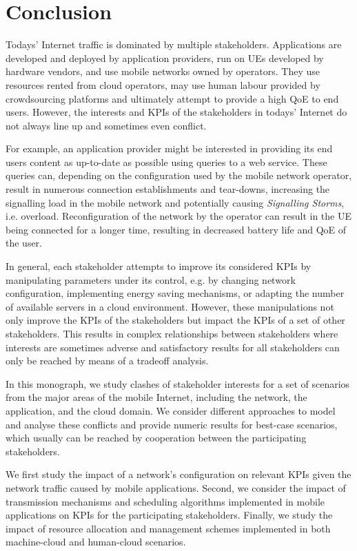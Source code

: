 \chapter{Conclusion}\label{chap:conclusion}

Todays' Internet traffic is dominated by multiple stakeholders.
Applications are developed and deployed by application providers, run on \glspl{UE} developed by hardware vendors, and use mobile networks owned by operators.
They use resources rented from cloud operators, may use human labour provided by crowdsourcing platforms and ultimately attempt to provide a high \gls{QoE} to end users.
However, the interests and \glspl{KPI} of the stakeholders in todays' Internet do not always line up and sometimes even conflict.%

For example, an application provider might be interested in providing its end users content as up-to-date as possible using queries to a web service.
These queries can, depending on the configuration used by the mobile network operator, result in numerous connection establishments and tear-downs, increasing the signalling load in the mobile network and potentially causing \emph{Signalling Storms}, i.e. overload.
Reconfiguration of the network by the operator can result in the \gls{UE} being connected for a longer time, resulting in decreased battery life and \gls{QoE} of the user.  

In general, each stakeholder attempts to improve its considered \glspl{KPI} by manipulating parameters under its control, e.g. by changing network configuration, implementing energy saving mechanisms, or adapting the number of available servers in a cloud environment.
However, these manipulations not only improve the \glspl{KPI} of the stakeholders but impact the \glspl{KPI} of a set of other stakeholders.
This results in complex relationships between stakeholders where interests are sometimes adverse and satisfactory results for all stakeholders can only be reached by means of a tradeoff analysis.

In this monograph, we study clashes of stakeholder interests for a set of scenarios from the major areas of the mobile Internet, including the network, the application, and the cloud domain.
We consider different approaches to model and analyse these conflicts and provide numeric results for best-case scenarios, which usually can be reached by cooperation between the participating stakeholders.

We first study the impact of a network's configuration on relevant \glspl{KPI} given the network traffic caused by mobile applications.
Second, we consider the impact of transmission mechanisms and scheduling algorithms implemented in mobile applications on \glspl{KPI} for the participating stakeholders.
Finally, we study the impact of resource allocation and management schemes implemented in both machine-cloud and human-cloud scenarios.


